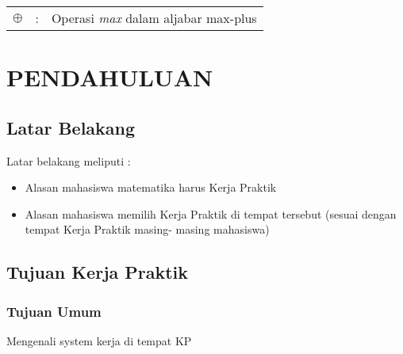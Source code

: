 \documentclass{file/KP-ITS}
\theoremstyle{definition}
\theoremstyle{definition}
\theoremstyle{plain}
\begin{document}

\BagianAwal
\Cover
\LembarJudul
\TitlePage
\LembarPengesahanDepartemen
\LembarPengesahanInstansi
\LembarOrisinalitas

\restoregeometry
\KataPengantar



\DaftarIsi\raggedbottom

\DaftarGambar

\DaftarTabel

\DaftarSimbol
\begin{flushleft}
\begin{tabular}{lrl}


$\oplus$ &:& Operasi \textit{max} dalam aljabar max-plus\\

\end{tabular}
\end{flushleft}

\BagianInti

\chapter{PENDAHULUAN}
\section{Latar Belakang}
Latar belakang meliputi :
\begin{itemize}
    \item Alasan mahasiswa matematika harus Kerja Praktik
    \item Alasan mahasiswa memilih Kerja Praktik di tempat tersebut
(sesuai dengan tempat Kerja Praktik masing- masing mahasiswa)
\end{itemize}

\section{Tujuan Kerja Praktik}
\subsection{Tujuan Umum}
Mengenali system kerja di tempat KP
\end{document}
